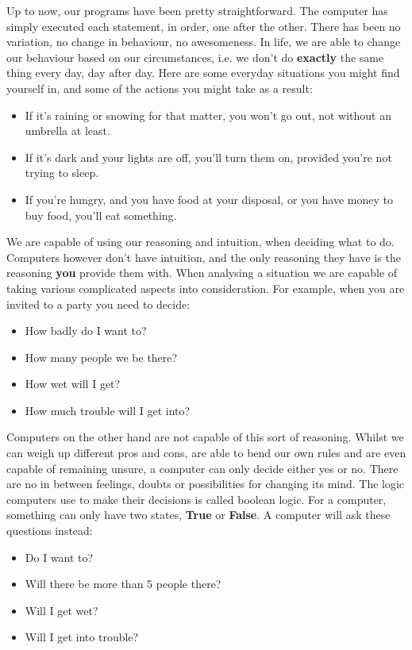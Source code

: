 
 Up to now, our programs have been pretty straightforward. The computer has simply executed each statement, in order, one after the other. There has been no variation, no change in behaviour, no awesomeness. In life, we are able to change our behaviour based on our circumstances, i.e. we don't do \textbf{exactly} the same thing every day, day after day. Here are some everyday situations you might find yourself in, and some of the actions you might take as a  result:
\begin{itemize}
	\item If it's raining or snowing for that matter, you won't go out, not without an umbrella at least.
	\item If it's dark and your lights are off, you'll turn them on, provided you're not trying to sleep.
	\item If you're hungry, and you have food at your disposal, or you have money to buy food, you'll eat something.
\end{itemize}

We are capable of using our reasoning and intuition, when deciding what to do. Computers however don't have intuition, and the only reasoning they have is the reasoning \textbf{you} provide them with.   When analysing a situation we are capable of taking various complicated aspects into consideration. For example, when you are invited to a party you need to decide:
\begin{itemize}
	\item  How badly do I want to?
	\item  How many people we be there?
	\item  How wet will I get?
	\item  How much trouble will I get into?
\end{itemize}

 Computers on the other hand are not capable of this sort of reasoning. Whilst we can weigh up different pros and cons, are able to bend our own rules and are even capable of remaining unsure, a computer can only decide either yes or no. There are no in between feelings, doubts or possibilities for changing its mind.   The logic computers use to make their decisions is called boolean logic. For a computer, something can only have two states, \textbf{True} or \textbf{ False}. A computer will ask these questions instead:
\begin{itemize}
	\item  Do I want to?
	\item  Will there be more than 5 people there?
	\item  Will I get wet?
	\item  Will I get into trouble?
\end{itemize}

